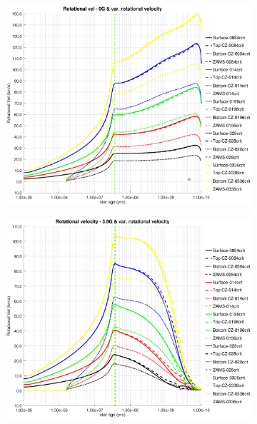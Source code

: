\documentclass[fleqn,usenatbib]{mnras}
\begin{document}
\begin{figure}
    \centering
    \begin{subfigure}[h]{0.47\textwidth}
    \includegraphics[trim = 30mm 15mm 20mm 15mm, clip,width=\textwidth]{figures/rot_vel_var_vel_0_0g.eps}
    \label{fig:subim41}
    \end{subfigure}
    \begin{subfigure}[h]{0.47\textwidth}
    \includegraphics[trim = 30mm 15mm 20mm 15mm, clip,width=\textwidth]{figures/rot_vel_var_vel_3_5g.eps}
    \label{fig:subim42}
    \end{subfigure}

\end{figure}
\end{document}
